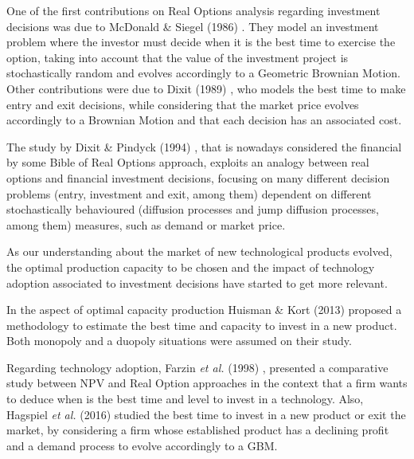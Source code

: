 One of the first contributions on Real Options analysis regarding investment decisions was due to McDonald \& Siegel (1986)  \cite{siegel}. They model an investment problem where the investor must decide when it is the best time to exercise the option, taking into account that the value of the investment project is stochastically random and evolves accordingly to a Geometric Brownian Motion. Other contributions were due to Dixit (1989) \cite{dixit_alone}, who models the best time to make entry and exit decisions, while considering that the market price evolves accordingly to a Brownian Motion and that each decision has an associated cost.

The study by Dixit \& Pindyck (1994) \cite{dixit:book}, that is nowadays considered the financial by some Bible of Real Options approach, exploits an analogy between real options and financial investment decisions, focusing on many different decision problems (entry, investment and exit, among them) dependent on different stochastically behavioured (diffusion processes and jump diffusion processes, among them) measures, such as demand or market price.


As our understanding about the market of new technological products evolved, the optimal production capacity to be chosen and the impact of technology adoption associated to investment decisions have started to get more relevant.

In the aspect of optimal capacity production Huisman \& Kort (2013) \cite{huis:cap} proposed a methodology to estimate the best time and capacity to invest in a new product. Both monopoly and a duopoly situations were assumed on their study.

Regarding technology adoption,
Farzin \textit{et al.} (1998) \cite{farzin:cap}, presented a comparative study between NPV and Real Option approaches in the context that a firm wants to deduce when is the best time and level to invest in a technology.
Also, Hagspiel \textit{et al.} (2016) \cite{hagspiel:cap} studied the best time to invest in a new product or exit the market, by considering a firm whose established product has a declining profit and a demand process to evolve accordingly to a GBM. %


